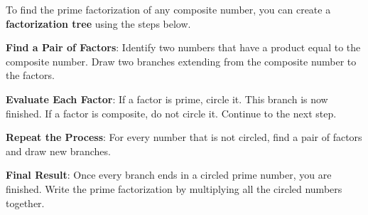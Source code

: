 \documentclass{ximera}[font=12pt]  %
\begin{document}
\begin{procedure}

To find the prime factorization of any composite number, you can create a \textbf{factorization tree} using the steps below.

\begin{description}[style=multiline, leftmargin=5em, font=\bfseries]

\item[Step 1] \textbf{Find a Pair of Factors}: Identify two numbers that have a product equal to the composite number.  
Draw two branches extending from the composite number to the factors.

\item[Step 2] \textbf{Evaluate Each Factor}: If a factor is prime, circle it. This branch is now finished.  If a factor is 
composite, do not circle it. Continue to the next step.

\item[Step 3] \textbf{Repeat the Process}: For every number that is not circled, find a pair of factors and draw new branches.


\item[Step 4] \textbf{Final Result}: Once every branch ends in a circled prime number, you are finished.  Write the prime factorization by multiplying all the circled numbers together.

\end{description}

\end{procedure}
\end{document}
